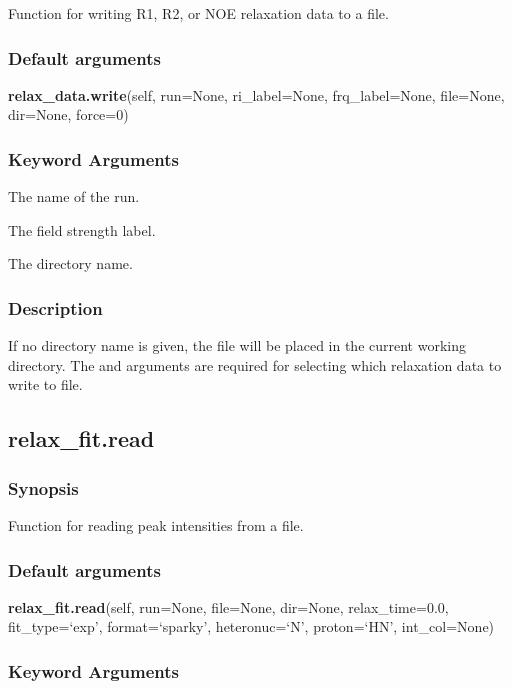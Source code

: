 Function for writing R1, R2, or NOE relaxation data to a file.

\subsubsection{Default arguments}

\textsf{\textbf{relax\_data.write}(self, run=None, ri\_label=None, frq\_label=None, file=None, dir=None, force=0)}


\subsubsection{Keyword Arguments}

  The name of the run.

  The field strength label.

  The directory name.


\subsubsection{Description}

If no directory name is given, the file will be placed in the current working directory.
The 
 and 
 arguments are required for selecting which relaxation data
to write to file.


\newpage

\subsection{relax\_fit.read}


\subsubsection{Synopsis}

Function for reading peak intensities from a file.

\subsubsection{Default arguments}

\textsf{\textbf{relax\_fit.read}(self, run=None, file=None, dir=None, relax\_time=0.0, fit\_type=`exp', format=`sparky', heteronuc=`N', proton=`HN', int\_col=None)}


\subsubsection{Keyword Arguments}

